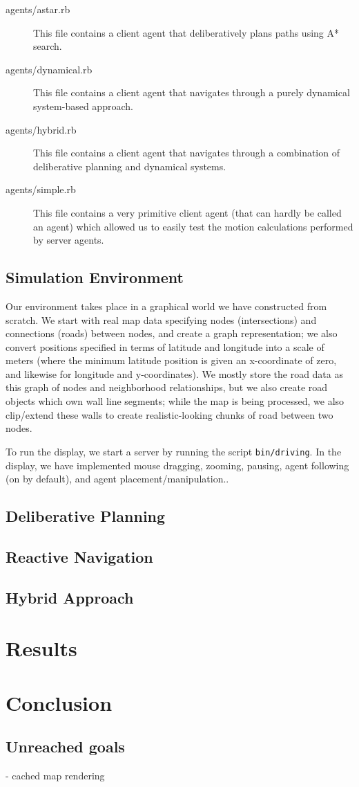 \documentclass{article}
\newcommand{\code}{\texttt}
\begin{document}
\begin{description}
\item[agents/astar.rb] This file contains a client agent that deliberatively
  plans paths using A* search.

\item[agents/dynamical.rb] This file contains a client agent that navigates
  through a purely dynamical system-based approach.

\item[agents/hybrid.rb] This file contains a client agent that navigates through
  a combination of deliberative planning and dynamical systems.

\item[agents/simple.rb] This file contains a very primitive client agent (that
  can hardly be called an agent) which allowed us to easily test the motion
  calculations performed by server agents.

\end{description}

\subsection{Simulation Environment}

Our environment takes place in a graphical world we have constructed from
scratch. We start with real map data specifying nodes (intersections) and
connections (roads) between nodes, and create a graph representation; we also
convert positions specified in terms of latitude and longitude into a scale of
meters (where the minimum latitude position is given an x-coordinate of zero,
and likewise for longitude and y-coordinates). We mostly store the road data as
this graph of nodes and neighborhood relationships, but we also create road
objects which own wall line segments; while the map is being processed, we also
clip/extend these walls to create realistic-looking chunks of road between two
nodes.

To run the display, we start a server by running the script
\code{bin/driving}. In the display, we have implemented mouse dragging, zooming,
pausing, agent following (on by default), and agent placement/manipulation..


\subsection{Deliberative Planning}

\subsection{Reactive Navigation}

\subsection{Hybrid Approach}

\section{Results}

\section{Conclusion}
\subsection{Unreached goals}
- cached map rendering
\end{document}

